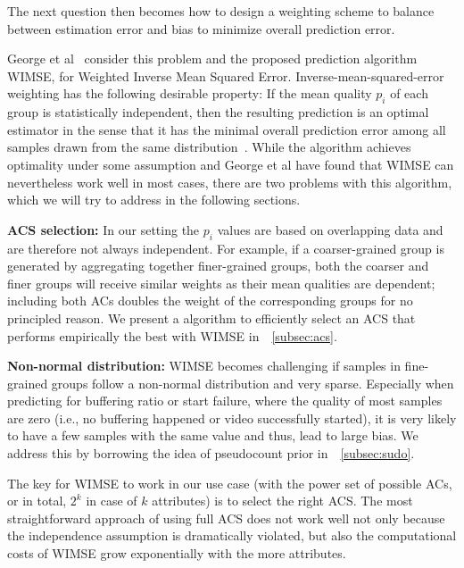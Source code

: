 The next question then becomes how to design a weighting scheme to balance between estimation error and bias to minimize overall prediction error. 

George et al~\cite{george2008value} consider this problem and the proposed prediction algorithm WIMSE, for Weighted Inverse Mean Squared Error.  Inverse-mean-squared-error weighting has the following desirable property: If the mean quality $p_i$ of each group is statistically independent, then the resulting prediction is an optimal estimator in the sense that it has the minimal overall prediction error among all samples drawn from the same distribution~\cite{george2008value}.
While the algorithm achieves optimality under some assumption and George et al have found that WIMSE can nevertheless work well in most cases, there are two problems with this algorithm, which we will try to address in the following sections.
\begin{packeditemize}
	\item {\bf ACS selection:} In our setting the $p_i$ values are based on overlapping data and are therefore not always independent. For example, if a coarser-grained group is generated by aggregating together finer-grained groups, both the coarser and finer groups will receive similar weights as their mean qualities are dependent; including both ACs doubles the weight of the corresponding groups for no principled reason. We present a algorithm to efficiently select an ACS that performs empirically the best with WIMSE in~\Section~\ref{subsec:acs}.
	\item {\bf Non-normal distribution:}  WIMSE becomes challenging if samples in fine-grained groups follow a non-normal distribution and very sparse. Especially when predicting for buffering ratio or start failure, where the quality of most samples are zero (i.e., no buffering happened or video successfully started), it is very likely to have a few samples with the same value and thus, lead to large bias.  We address this by borrowing the idea of pseudocount prior in~\Section~\ref{subsec:sudo}.
\end{packeditemize}

\label{subsec:acs}
The key for WIMSE to work in our use case (with the power set of possible ACs, or in total, $2^k$ in case of $k$ attributes) is to select the right ACS.
The most straightforward approach of using full ACS does not work well not only because the independence assumption is dramatically violated, 
but also the computational costs of WIMSE grow exponentially with the more attributes.

